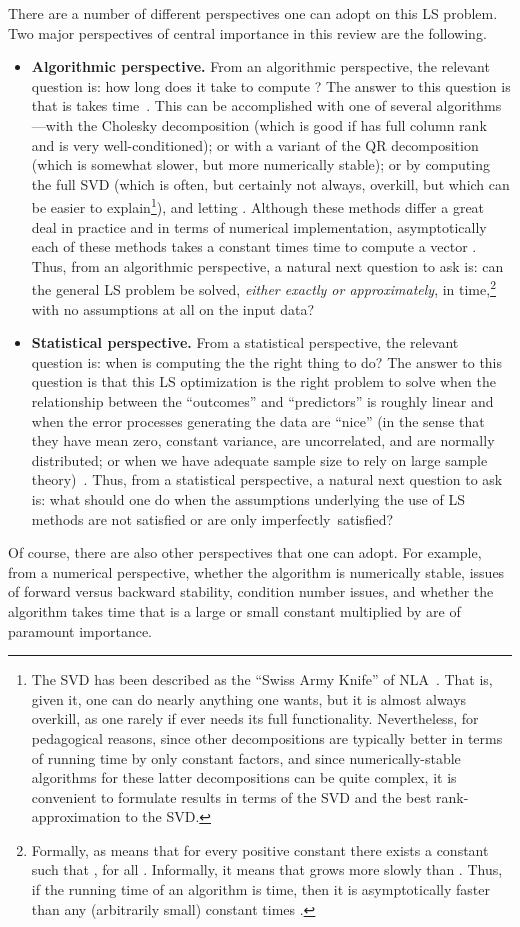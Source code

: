 \documentclass[twoside]{article}
\begin{document}
There are a number of different perspectives one can adopt on this LS 
problem.
Two major perspectives of central importance in this review are the 
following.
\begin{itemize}
\item
\textbf{Algorithmic perspective.}
From an algorithmic perspective, the relevant question is: how long does it 
take to compute ?
The answer to this question is that is takes  time~\cite{GVL96}.
This can be accomplished with one of several algorithms---with the Cholesky 
decomposition (which is good if  has full column rank and is very 
well-conditioned); or with a variant of the QR decomposition (which is 
somewhat slower, but more numerically stable); or by computing the full 
SVD  (which is often, but certainly not always, overkill, 
but which can be easier to explain\footnote{The SVD has been described as the ``Swiss Army Knife'' of 
NLA~\cite{MMDS06summary}.  That is, given it, one can do nearly anything one
wants, but it is almost always overkill, as one rarely if ever needs its full
functionality.  Nevertheless, for pedagogical reasons, since other 
decompositions are typically better in terms of running time by only constant 
factors, and since numerically-stable algorithms for these latter 
decompositions can be quite complex, it is convenient to formulate results in
terms of the SVD and the best rank- approximation to the SVD.}), 
and letting .
Although these methods differ a great deal in practice and in terms of 
numerical implementation, asymptotically each of these methods takes a 
constant times  time to compute a vector .
Thus, from an algorithmic perspective, a natural next question to ask is:
can the general LS problem be solved, \emph{either exactly or approximately}, 
in  time,\footnote{Formally,  as  means that for 
every positive constant  there exists a constant  such that
, for all .  Informally, it means that 
 grows more slowly than .  Thus, if the running time of an 
algorithm is  time, then it is asymptotically faster than any 
(arbitrarily small) constant times .}
with no assumptions at all on the input data?
\item
\textbf{Statistical perspective.}
From a statistical perspective, the relevant question is: when is computing 
the  the right thing to do?
The answer to this question is that this LS optimization is the right problem to
solve when the relationship between the ``outcomes'' and ``predictors'' is 
roughly linear and when the error processes generating the data are ``nice'' 
(in the sense that they have mean zero, constant variance, are uncorrelated, 
and are normally distributed; or when we have adequate sample size to rely 
on large sample theory)~\cite{ChatterjeeHadi88}.
Thus, from a statistical perspective, a natural next question to ask is:
what should one do when the assumptions underlying the use of LS methods 
are not satisfied or are only imperfectly~satisfied?
\end{itemize}
Of course, there are also other perspectives that one can adopt.
For example, from a numerical perspective, whether the algorithm is 
numerically stable, issues of forward versus backward stability, condition
number issues, and whether the algorithm takes time that is a large or small 
constant multiplied by  are of paramount importance.
\end{document}
